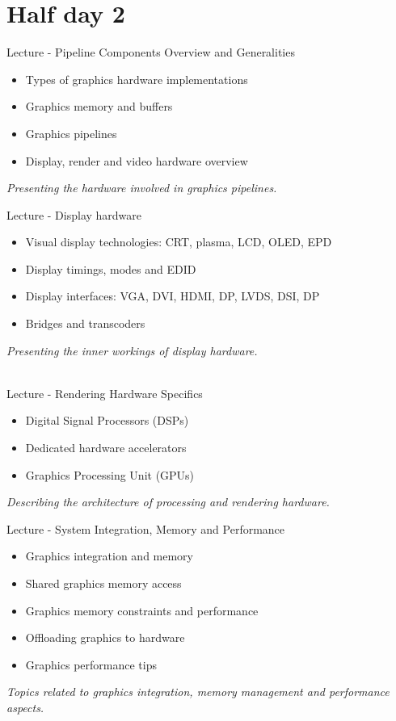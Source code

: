 \documentclass[a4paper,12pt,obeyspaces,spaces,hyphens]{article}
\begin{document}
\section{Half day 2}

\feagendatwocolumn
{Lecture - Pipeline Components Overview and Generalities}
{
  \begin{itemize}
  \item Types of graphics hardware implementations
  \item Graphics memory and buffers
  \item Graphics pipelines
  \item Display, render and video hardware overview
  \end{itemize}
  \vspace{0.5em}
  {\em Presenting the hardware involved in graphics pipelines.}
}
{Lecture - Display hardware}
{
  \begin{itemize}
  \item Visual display technologies: CRT, plasma, LCD, OLED, EPD
  \item Display timings, modes and EDID
  \item Display interfaces: VGA, DVI, HDMI, DP, LVDS, DSI, DP
  \item Bridges and transcoders
  \end{itemize}
  \vspace{0.5em}
  {\em Presenting the inner workings of display hardware.}
}
\\

\feagendatwocolumn
{Lecture - Rendering Hardware Specifics}
{
  \begin{itemize}
  \item Digital Signal Processors (DSPs)
  \item Dedicated hardware accelerators
  \item Graphics Processing Unit (GPUs)
  \end{itemize}
  \vspace{0.5em}
  {\em Describing the architecture of processing and rendering hardware.}
}
{Lecture - System Integration, Memory and Performance}
{
  \begin{itemize}
  \item Graphics integration and memory
  \item Shared graphics memory access
  \item Graphics memory constraints and performance
  \item Offloading graphics to hardware
  \item Graphics performance tips
  \end{itemize}
  \vspace{0.5em}
  {\em Topics related to graphics integration, memory management and performance aspects.}
}
\end{document}
